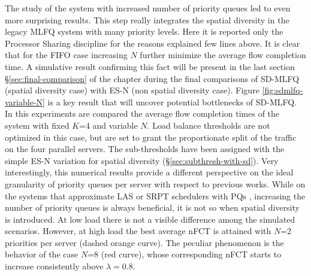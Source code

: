 The study of the system with increased number of priority queues led to even more surprising results. This step really integrates the spatial diversity in the legacy MLFQ system with many priority levels. Here it is reported only the Processor Sharing discipline for the reasons explained few lines above. It is clear that for the FIFO case increasing $N$ further minimize the average flow completion time. A simulative result confirming this fact will be present in the last section \S \ref{sec:final-comparison} of the chapter during the final comparisons of SD-MLFQ (spatial diversity case) with ES-N (non spatial diversity case). Figure \ref{fig:sdmlfq-variable-N} is a key result that will uncover potential bottlenecks of SD-MLFQ. In this experiments are compared the average flow completion times of the system with fixed $K$=4 and variable $N$. Load balance thresholds are not optimized in this case, but are set to grant the proportionate split of the traffic on the four parallel servers. The sub-thresholds have been assigned with the simple ES-N variation for spatial diversity (\S \ref{sec:subthresh-with-sd}). Very interestingly, this numerical results provide a different perspective on the ideal granularity of priority queues per server with respect to previous works. While on the systems that approximate LAS or SRPT schedulers with PQs  \cite{pias, pFabric}, increasing the number of priority queues is always beneficial, it is not so when spatial diversity is introduced. At low load there is not a visible difference among the simulated scenarios. However, at high load the best average nFCT is attained with $N$=2 priorities per server (dashed orange curve). The peculiar phenomenon is the behavior of the case $N$=8 (red curve), whose corresponding nFCT starts to increase consistently above $\lambda=0.8$. 
